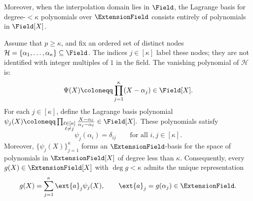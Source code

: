 Moreover, when the interpolation domain lies in \(\Field\), the Lagrange basis for degree-\(<\kappa\) polynomials over \(\ExtensionField\) consists entirely of polynomials in \(\Field[X]\).


\begin{definition}
\label{def:lagrange}
Assume that \(p\geq\kappa\), and fix an ordered set of distinct
nodes \(\mathcal H=\{\alpha_1,\ldots,\alpha_\kappa\}\subseteq\Field\).
The indices \(j\in[\kappa]\) label these nodes; they are not
identified with integer multiples of \(1\) in the field.
The vanishing polynomial of \(\mathcal H\) is:
\[
    \Psi(X)
    \coloneqq
    \prod_{j=1}^{\kappa}(X-\alpha_j)
    \in\Field[X].
\]
For each \(j\in[\kappa]\), define the Lagrange basis polynomial
\(
    \psi_j(X)
    \coloneqq
    \prod_{\substack{\ell\in[\kappa]\\ \ell\neq j}}
    \frac{X-\alpha_\ell}{\alpha_j-\alpha_\ell}
    \in\Field[X].
\)
These polynomials satisfy
\[
    \psi_j(\alpha_i)=\delta_{ij}
    \qquad
    \text{for all }i,j\in[\kappa].
\]
Moreover, \(\{\psi_j(X)\}_{j=1}^{\kappa}\) forms an
\(\ExtensionField\)-basis for the space of polynomials in
\(\ExtensionField[X]\) of degree less than \(\kappa\).
Consequently, every \(g(X)\in\ExtensionField[X]\) with
\(\deg g<\kappa\) admits the unique representation
\[
    g(X)
    =
    \sum_{j=1}^{\kappa}
    \ext{a}_j\psi_j(X),
    \qquad
    \ext{a}_j=g(\alpha_j)\in\ExtensionField.
\]
\end{definition}
